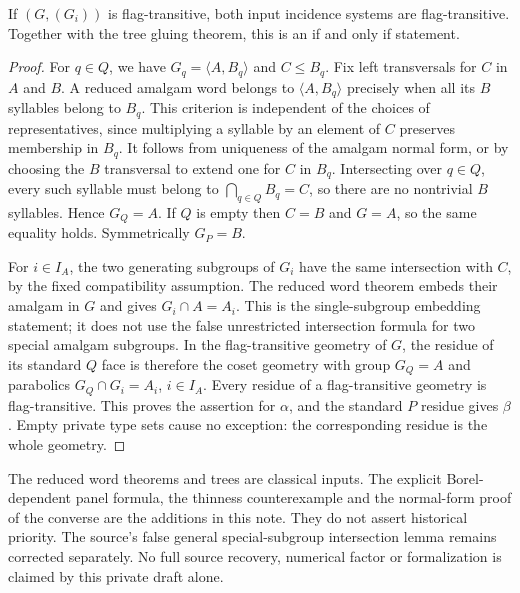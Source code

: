 \begin{proposition}\label{prop:converse}
If $(G,(G_i))$ is flag-transitive, both input incidence systems are
flag-transitive. Together with the tree gluing theorem, this is an
if and only if statement.
\end{proposition}
\begin{proof}
For $q\in Q$, we have $G_q=\langle A,B_q\rangle$ and
$C\leq B_q$. Fix left transversals for $C$ in $A$ and $B$.
A reduced amalgam word belongs to $\langle A,B_q\rangle$
precisely when all its $B$ syllables belong to $B_q$. This criterion
is independent of the choices of representatives, since multiplying
a syllable by an element of $C$ preserves membership in $B_q$.
It follows from uniqueness of the amalgam normal form, or by choosing
the $B$ transversal to extend one for $C$ in $B_q$.
Intersecting over $q\in Q$, every such syllable must belong to
$\bigcap_{q\in Q}B_q=C$, so there are no nontrivial $B$
syllables. Hence $G_Q=A$. If $Q$ is empty then $C=B$ and
$G=A$, so the same equality holds. Symmetrically $G_P=B$.

For $i\in I_A$, the two generating subgroups of $G_i$ have the
same intersection with $C$, by the fixed compatibility assumption.
The reduced word theorem embeds their amalgam in $G$ and gives
$G_i\cap A=A_i$. This is the single-subgroup embedding statement;
it does not use the false unrestricted intersection formula for two
special amalgam subgroups. In the flag-transitive geometry of $G$,
the residue of its standard $Q$ face is therefore the coset geometry
with group $G_Q=A$ and parabolics $G_Q\cap G_i=A_i$,
$i\in I_A$. Every residue of a flag-transitive geometry is
flag-transitive. This proves the assertion for $\alpha$, and the
standard $P$ residue gives $\beta$. Empty private type sets cause
no exception: the corresponding residue is the whole geometry.
\end{proof}

The reduced word theorems and trees are classical inputs. The explicit
Borel-dependent panel formula, the thinness counterexample and the
normal-form proof of the converse are the additions in this note.
They do not assert historical priority. The source's false general
special-subgroup intersection lemma remains corrected separately.
No full source recovery, numerical factor or formalization is claimed
by this private draft alone.

